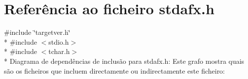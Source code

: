 \hypertarget{a00017}{\section{Referência ao ficheiro stdafx.\+h}
\label{a00017}
}
{\ttfamily \#include \char`\"{}targetver.\+h\char`\"{}}\\*
{\ttfamily \#include $<$stdio.\+h$>$}\\*
{\ttfamily \#include $<$tchar.\+h$>$}\\*
Diagrama de dependências de inclusão para stdafx.\+h\+:
Este grafo mostra quais são os ficheiros que incluem directamente ou indirectamente este ficheiro\+:
